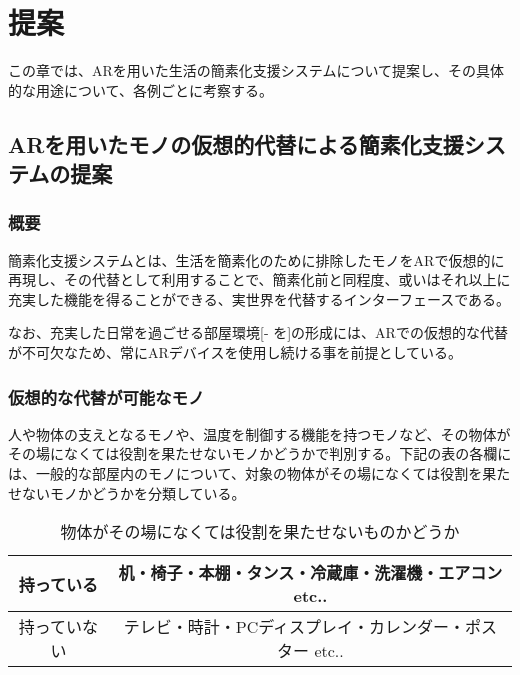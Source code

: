 
\chapter{提案}
\label{chap:suggestion}

この章では、ARを用いた生活の簡素化支援システムについて提案し、その具体的な用途について、各例ごとに考察する。

\newpage

\section{ARを用いたモノの仮想的代替による簡素化支援システムの提案}
\label{chap:suggestionDetail}

\subsection{概要}

簡素化支援システムとは、生活を簡素化のために排除したモノをARで仮想的に再現し、その代替として利用することで、簡素化前と同程度、或いはそれ以上に充実した機能を得ることができる、実世界を代替するインターフェースである。

なお、充実した日常を過ごせる部屋環境[- を]の形成には、ARでの仮想的な代替が不可欠なため、常にARデバイスを使用し続ける事を前提としている。

\subsection{仮想的な代替が可能なモノ}

人や物体の支えとなるモノや、温度を制御する機能を持つモノなど、その物体がその場になくては役割を果たせないモノかどうかで判別する。下記の表の各欄には、一般的な部屋内のモノについて、対象の物体がその場になくては役割を果たせないモノかどうかを分類している。

\begin{table}[htbp]
    \caption{物体がその場になくては役割を果たせないものかどうか}
    \label{tb:mono}
    \begin{center}\begin{tabular}{c|c}
      \hline
      持っている&机・椅子・本棚・タンス・冷蔵庫・洗濯機・エアコン etc..\\\hline
      持っていない&テレビ・時計・PCディスプレイ・カレンダー・ポスター etc..\\\hline
    \end{tabular}\end{center}
\end{table}

